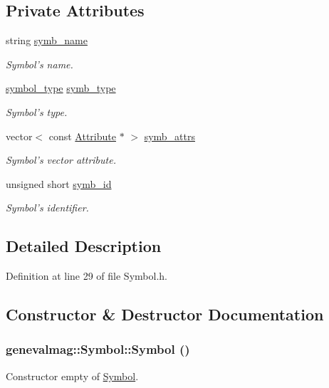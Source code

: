 \subsection*{Private Attributes}
\begin{DoxyCompactItemize}
\item 
string \hyperlink{classgenevalmag_1_1Symbol_a72161dc9f286b5b4e18c4f849de52ebd}{symb\_\-name}
\begin{DoxyCompactList}\small\item\em Symbol's name. \item\end{DoxyCompactList}\item 
\hyperlink{namespacegenevalmag_a4c1cf205cb145b09e46df5277bcc70c6}{symbol\_\-type} \hyperlink{classgenevalmag_1_1Symbol_aa8557500c1049fa8605e3ecebb27f89c}{symb\_\-type}
\begin{DoxyCompactList}\small\item\em Symbol's type. \item\end{DoxyCompactList}\item 
vector$<$ const \hyperlink{classgenevalmag_1_1Attribute}{Attribute} $\ast$ $>$ \hyperlink{classgenevalmag_1_1Symbol_a5085d920f7836a0b44993cc0e167e4c7}{symb\_\-attrs}
\begin{DoxyCompactList}\small\item\em Symbol's vector attribute. \item\end{DoxyCompactList}\item 
unsigned short \hyperlink{classgenevalmag_1_1Symbol_aea1a4b2cd5d6ddd60a0f4c68989c11bd}{symb\_\-id}
\begin{DoxyCompactList}\small\item\em Symbol's identifier. \item\end{DoxyCompactList}\end{DoxyCompactItemize}


\subsection{Detailed Description}


Definition at line 29 of file Symbol.h.



\subsection{Constructor \& Destructor Documentation}
\hypertarget{classgenevalmag_1_1Symbol_a52c72b2631eb77cec685aae2bd61ab4d}{
\subsubsection[{Symbol}]{\setlength{\rightskip}{0pt plus 5cm}genevalmag::Symbol::Symbol ()}}
\label{classgenevalmag_1_1Symbol_a52c72b2631eb77cec685aae2bd61ab4d}
Constructor empty of \hyperlink{classgenevalmag_1_1Symbol}{Symbol}. 

